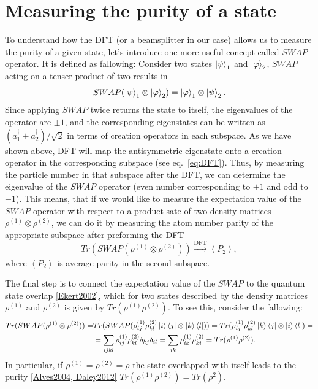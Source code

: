 \section{Measuring the purity of a state}
To understand how the DFT (or a beamsplitter in our case) allows us to measure the purity of a given state, let's introduce one more useful concept called $SWAP$ operator. It is defined as fallowing: Consider two states $\left|\psi\right\rangle_1$ and $\left|\varphi\right\rangle_2$, $SWAP$ acting on a tenser product of two results in 
\begin{equation}
SWAP(\left|\psi\right\rangle_1 \otimes \left|\varphi\right\rangle_2) = \left|\varphi\right\rangle_1 \otimes \left|\psi\right\rangle_2.
\end{equation}
Since applying $SWAP$ twice returns the state to itself, the eigenvalues of the operator are $\pm 1$, and the corresponding eigenstates can be written as $(a^{\dagger}_1 \pm a^{\dagger}_2)/\sqrt{2}$ in terms of creation operators in each subspace. As we have shown above, DFT will map the antisymmetric eigenstate onto a creation operator in the corresponding subspace (see eq.~\ref{eq:DFT}). Thus, by measuring the particle number in that subspace after the DFT, we can determine the eigenvalue of the $SWAP$ operator (even number corresponding to $+1$ and odd to $-1$). This means, that if we would like to measure the expectation value of the $SWAP$ operator with respect to a product sate of two density matrices $\rho^{(1)} \otimes \rho^{(2)}$, we can do it by measuring the atom number parity of the appropriate subspace after preforming the DFT
\begin{equation}
Tr(SWAP(\rho^{(1)} \otimes \rho^{(2)})) \xrightarrow[]{\text{DFT}} \left< P_2 \right>,
\end{equation}
where $\left< P_2 \right>$ is average parity in the second subspace.

The final step is to connect the expectation value of the $SWAP$ to the quantum state overlap \ref{Ekert2002}, which for two states described by the density matrices $\rho^{(1)}$ and $\rho^{(2)}$ is given by $Tr(\rho^{(1)} \rho^{(2)})$. To see this, consider the fallowing:
\begin{equation}
\begin{aligned}
Tr(SWAP(\rho^{(1)} \otimes \rho^{(2)})) =& Tr(SWAP(\rho^{(1)}_{ij} \rho^{(2)}_{kl} \left|i\right\rangle\left\langle j\right| \otimes \left|k\right\rangle\left\langle l\right|)) =Tr(\rho^{(1)}_{ij} \rho^{(2)}_{kl} \left|k\right\rangle\left\langle j\right| \otimes \left|i\right\rangle\left\langle l\right|) = \\
&=\sum_{ijkl}\rho^{(1)}_{ij} \rho^{(2)}_{kl} \delta_{kj} \delta_{il} = \sum_{ik}\rho^{(1)}_{ik} \rho^{(2)}_{ki} = Tr(\rho^{(1)} \rho^{(2)}).
\end{aligned}
\end{equation}
In particular, if $\rho^{(1)}=\rho^{(2)}=\rho$ the state overlapped with itself leads to the purity \ref{Alves2004, Daley2012} $Tr(\rho^{(1)} \rho^{(2)}) = Tr(\rho^2)$.

